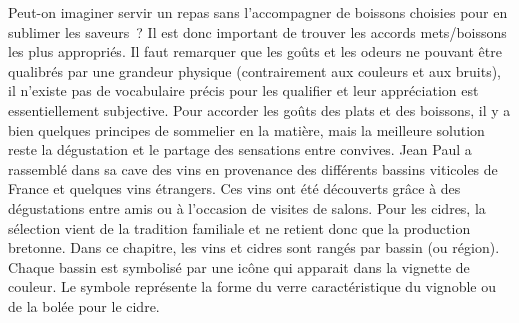 Peut-on imaginer servir un repas sans l’accompagner de boissons choisies pour en sublimer les saveurs ? Il est donc important de trouver les accords mets/boissons les plus appropriés. Il faut remarquer que les goûts et les odeurs ne pouvant être qualibrés par une grandeur physique (contrairement aux couleurs et aux bruits), il n’existe pas de vocabulaire précis pour les qualifier et leur appréciation est essentiellement subjective.
Pour accorder les goûts des plats et des boissons, il y a bien quelques principes de sommelier en la matière, mais la meilleure solution reste la dégustation et le partage des sensations entre convives. 
Jean Paul a rassemblé dans sa cave des vins en provenance des différents bassins viticoles de France et quelques vins étrangers. Ces vins ont été découverts grâce à des dégustations entre amis ou à l’occasion de visites de salons. Pour les cidres, la sélection vient de la tradition familiale et ne retient donc que la production bretonne. 
Dans ce chapitre, les vins et cidres sont rangés par bassin (ou région). Chaque bassin est symbolisé par une icône qui apparait dans la vignette de couleur. Le symbole représente la forme du verre caractéristique du vignoble ou de la bolée pour le cidre.
\medskip
